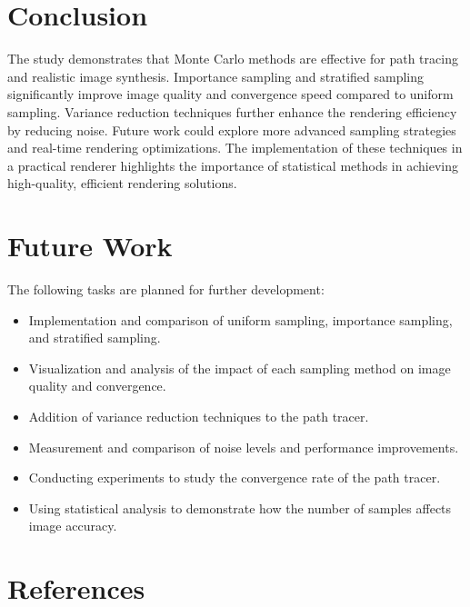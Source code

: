 \documentclass[12pt]{article}
\begin{document}
\section{Conclusion}
\label{sec:conclusion}
The study demonstrates that Monte Carlo methods are effective for path tracing and realistic image synthesis. Importance sampling and stratified sampling significantly improve image quality and convergence speed compared to uniform sampling. Variance reduction techniques further enhance the rendering efficiency by reducing noise. Future work could explore more advanced sampling strategies and real-time rendering optimizations. The implementation of these techniques in a practical renderer highlights the importance of statistical methods in achieving high-quality, efficient rendering solutions.

\section{Future Work}
\label{sec:future-work}
The following tasks are planned for further development:
\begin{itemize}
    \item Implementation and comparison of uniform sampling, importance sampling, and stratified sampling.
    \item Visualization and analysis of the impact of each sampling method on image quality and convergence.
    \item Addition of variance reduction techniques to the path tracer.
    \item Measurement and comparison of noise levels and performance improvements.
    \item Conducting experiments to study the convergence rate of the path tracer.
    \item Using statistical analysis to demonstrate how the number of samples affects image accuracy.
\end{itemize}

\section{References}
\label{sec:references}


\end{document}
